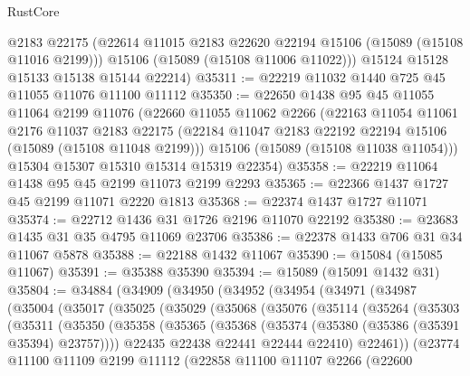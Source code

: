 \begin{lexlean}{RustCore}
\begin{coremodule}
        @2183
        @22175
        (@22614 @11015 @2183 @22620 @22194 @15106 (@15089 (@15108 @11016 @2199)))
        @15106
        (@15089 (@15108 @11006 @11022)))
      @15124
      @15128
      @15133
      @15138
      @15144
      @22214)
@35311 := @22219 @11032 @1440 @725 @45 @11055 @11076 @11100 @11112
@35350 := @22650
    @1438
    @95
    @45
    @11055
    @11064
    @2199
    @11076
    (@22660
      @11055
      @11062
      @2266
      (@22163
        @11054
        @11061
        @2176
        @11037
        @2183
        @22175
        (@22184 @11047 @2183 @22192 @22194 @15106 (@15089 (@15108 @11048 @2199)))
        @15106
        (@15089 (@15108 @11038 @11054)))
      @15304
      @15307
      @15310
      @15314
      @15319
      @22354)
@35358 := @22219 @11064 @1438 @95 @45 @2199 @11073 @2199 @2293
@35365 := @22366 @1437 @1727 @45 @2199 @11071 @2220 @1813
@35368 := @22374 @1437 @1727 @11071
@35374 := @22712 @1436 @31 @1726 @2196 @11070 @22192
@35380 := @23683 @1435 @31 @35 @4795 @11069 @23706
@35386 := @22378 @1433 @706 @31 @34 @11067 @5878
@35388 := @22188 @1432 @11067
@35390 := @15084 (@15085 @11067)
@35391 := @35388 @35390
@35394 := @15089 (@15091 @1432 @31)
@35804 := @34884
    (@34909
      (@34950
        (@34952
          (@34954
            (@34971
              (@34987
                (@35004
                  (@35017
                    (@35025
                      (@35029
                        (@35068
                          (@35076
                            (@35114
                              (@35264
                                (@35303
                                  (@35311
                                    (@35350
                                      (@35358
                                        (@35365
                                          (@35368 (@35374 (@35380 (@35386 (@35391 @35394) @23757))))
                                          @22435
                                          @22438
                                          @22441
                                          @22444
                                          @22410)
                                        @22461))
                                    (@23774
                                      @11100
                                      @11109
                                      @2199
                                      @11112
                                      (@22858
                                        @11100
                                        @11107
                                        @2266
                                        (@22600

\end{coremodule}
\end{lexlean}
